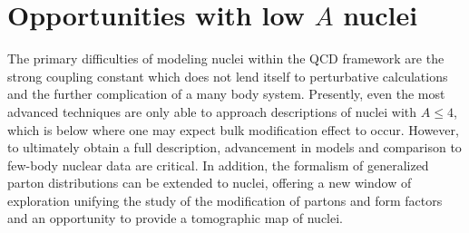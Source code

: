 \section{Opportunities with low $A$ nuclei}

The primary difficulties of modeling nuclei within the QCD framework are the
strong coupling constant which does not lend itself to perturbative calculations
and the further complication of a many body system.  Presently, 
even the most advanced
techniques are only able to approach descriptions of nuclei with $A \le 4$, 
which is below where one may expect bulk modification effect to occur.  However,
to ultimately obtain a full description, advancement in models and comparison
to few-body nuclear data are critical.  In addition, the formalism of generalized
parton distributions can be extended to nuclei,  offering a new window of 
exploration unifying the study of the modification of partons and form factors
and an opportunity to provide a tomographic map of nuclei.

